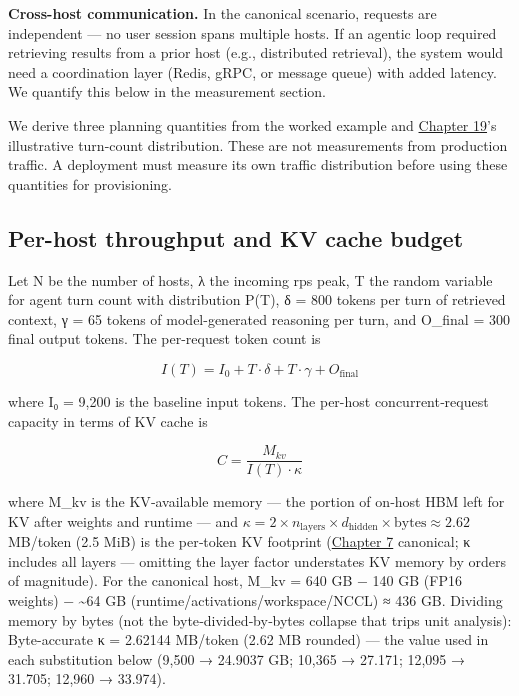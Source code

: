 \textbf{Cross-host communication.} In the canonical scenario, requests
are independent --- no user session spans multiple hosts. If an agentic
loop required retrieving results from a prior host (e.g., distributed
retrieval), the system would need a coordination layer (Redis, gRPC, or
message queue) with added latency. We quantify this below in the
measurement section.

\label{measurement}


We derive three planning quantities from the worked example and \hyperref[chap:19]{Chapter 19}'s illustrative turn-count distribution. These are not measurements
from production traffic. A deployment must measure its own traffic
distribution before using these quantities for provisioning.

\subsection{Per-host throughput and KV cache
budget}\label{per-host-throughput-and-kv-cache-budget}

Let N be the number of hosts, λ the incoming rps peak, T the random
variable for agent turn count with distribution P(T), δ = 800 tokens per
turn of retrieved context, γ = 65 tokens of model-generated reasoning
per turn, and O\_final = 300 final output tokens. The per-request token
count is

\[
I(T) = I_0 + T \cdot \delta + T \cdot \gamma + O_\text{final}
\]

where I₀ = 9,200 is the baseline input tokens. The per-host
concurrent‑request capacity in terms of KV cache is

\[
C = \frac{M_{kv}}{I(T) \cdot \kappa}
\]

where M\_kv is the KV‑available memory --- the portion of on‑host HBM
left for KV after weights and runtime --- and
\(\kappa = 2 \times n_\text{layers} \times d_\text{hidden} \times \text{bytes} \approx 2.62\)
MB/token (2.5 MiB) is the per‑token KV footprint (\hyperref[chap:7]{Chapter 7} canonical; κ
includes all layers --- omitting the layer factor understates KV memory
by orders of magnitude). For the canonical host, M\_kv = 640 GB − 140 GB
(FP16 weights) − \textasciitilde64 GB
(runtime/activations/workspace/NCCL) ≈ 436 GB. Dividing memory by bytes
(not the byte‑divided‑by‑bytes collapse that trips unit analysis):
Byte-accurate κ = 2.62144 MB/token (2.62 MB rounded) --- the value used
in each substitution below (9,500 → 24.9037 GB; 10,365 → 27.171; 12,095
→ 31.705; 12,960 → 33.974).

